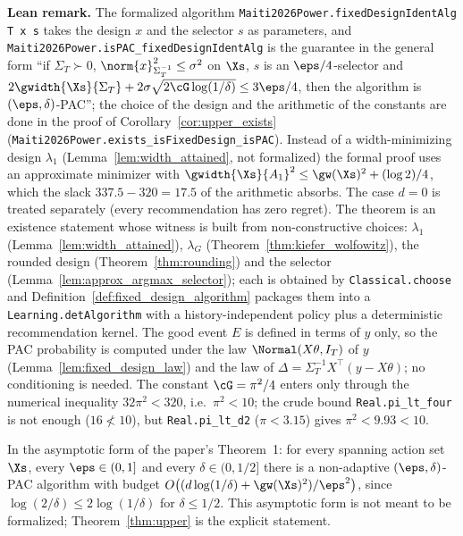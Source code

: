 \textbf{Lean remark.} The formalized algorithm \texttt{Maiti2026Power.fixedDesignIdentAlg T x s}
takes the design $x$ and the selector $s$ as parameters, and
\texttt{Maiti2026Power.isPAC\_fixedDesignIdentAlg} is the guarantee in the general form ``if
$\Sigma_T \succ 0$, $\norm{x}^2_{\Sigma_T^{-1}} \le \sigma^2$ on $\Xs$, $s$ is an $\eps/4$-selector
and $2\gwidth{\Xs}{\Sigma_T} + 2\sigma\sqrt{2\cG\log(1/\delta)} \le 3\eps/4$, then the
algorithm is $(\eps,\delta)$-PAC''; the choice of the design and the arithmetic of the
constants are done in the proof of Corollary~\ref{cor:upper_exists}
(\texttt{Maiti2026Power.exists\_isFixedDesign\_isPAC}). Instead of a width-minimizing design
$\lambda_1$ (Lemma~\ref{lem:width_attained}, not formalized) the formal proof uses an
approximate minimizer with $\gwidth{\Xs}{A_1}^2 \le \gw(\Xs)^2 + (\log 2)/4$, which the slack
$337.5 - 320 = 17.5$ of the arithmetic absorbs. The case $d = 0$ is treated separately (every
recommendation has zero regret). The theorem is an existence statement whose witness is built from
non-constructive choices: $\lambda_1$ (Lemma~\ref{lem:width_attained}), $\lambda_G$
(Theorem~\ref{thm:kiefer_wolfowitz}), the rounded design (Theorem~\ref{thm:rounding}) and the
selector (Lemma~\ref{lem:approx_argmax_selector}); each is obtained by \texttt{Classical.choose}
and Definition~\ref{def:fixed_design_algorithm} packages them into a
\texttt{Learning.detAlgorithm} with a history-independent policy plus a deterministic
recommendation kernel. The good event $E$ is defined in terms of $y$ only, so the PAC
probability is computed under the law $\Normal(X\theta,I_T)$ of $y$
(Lemma~\ref{lem:fixed_design_law}) and the law of $\Delta = \Sigma_T^{-1}X^\top(y - X\theta)$; no
conditioning is needed. The constant $\cG = \pi^2/4$ enters only through the numerical
inequality $32\pi^2 < 320$, i.e.\ $\pi^2 < 10$; the crude bound \texttt{Real.pi\_lt\_four}
is not enough ($16 \not< 10$), but \texttt{Real.pi\_lt\_d2} ($\pi < 3.15$) gives
$\pi^2 < 9.93 < 10$.

\begin{remark}\label{rem:upper_asymptotic}
In the asymptotic form of the paper's Theorem~1: for every spanning action set $\Xs$, every
$\eps \in (0,1]$ and every $\delta \in (0,1/2]$ there is a non-adaptive $(\eps,\delta)$-PAC
algorithm with budget $O\big((d\log(1/\delta) + \gw(\Xs)^2)/\eps^2\big)$, since
$\log(2/\delta) \le 2\log(1/\delta)$ for $\delta \le 1/2$. This asymptotic form is not meant to
be formalized; Theorem~\ref{thm:upper} is the explicit statement.
\end{remark}

